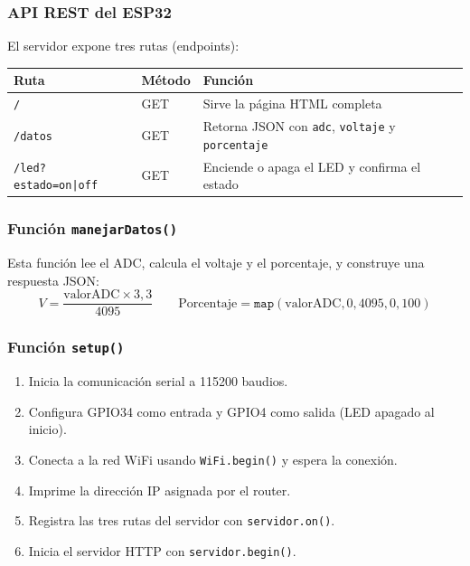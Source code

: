 \documentclass[12pt,a4paper]{article}
\begin{document}
\subsubsection*{API REST del ESP32}

El servidor expone tres rutas (endpoints):

\begin{center}
\begin{tabular}{llp{7cm}}
\toprule
\textbf{Ruta} & \textbf{Método} & \textbf{Función} \\
\midrule
\texttt{/} & GET & Sirve la página HTML completa \\
\texttt{/datos} & GET & Retorna JSON con \texttt{adc}, \texttt{voltaje} y \texttt{porcentaje} \\
\texttt{/led?estado=on|off} & GET & Enciende o apaga el LED y confirma el estado \\
\bottomrule
\end{tabular}
\end{center}

\subsubsection*{Función \texttt{manejarDatos()}}

Esta función lee el ADC, calcula el voltaje y el porcentaje, y construye una respuesta JSON:
\begin{equation}
V = \frac{\text{valorADC} \times 3{,}3}{4095} \qquad \text{Porcentaje} = \texttt{map}(\text{valorADC}, 0, 4095, 0, 100)
\label{eq:voltaje}
\end{equation}

\subsubsection*{Función \texttt{setup()}}

\begin{enumerate}
    \item Inicia la comunicación serial a 115200 baudios.
    \item Configura GPIO34 como entrada y GPIO4 como salida (LED apagado al inicio).
    \item Conecta a la red WiFi usando \texttt{WiFi.begin()} y espera la conexión.
    \item Imprime la dirección IP asignada por el router.
    \item Registra las tres rutas del servidor con \texttt{servidor.on()}.
    \item Inicia el servidor HTTP con \texttt{servidor.begin()}.
\end{enumerate}
\end{document}
